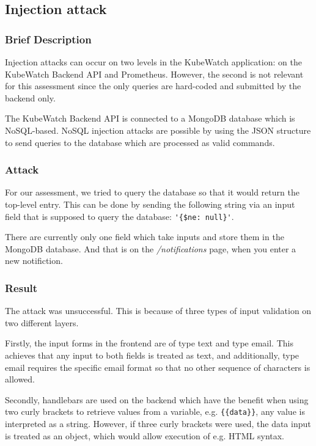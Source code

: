 \subsection{Injection attack}
\subsubsection{Brief Description}
Injection attacks can occur on two levels in the KubeWatch application: on the KubeWatch Backend API and Prometheus. However, the second is not relevant for this assessment since the only queries are hard-coded and submitted by the backend only.

The KubeWatch Backend API is connected to a MongoDB database which is NoSQL-based. NoSQL injection attacks are possible by using the JSON structure to send queries to the database which are processed as valid commands.

\subsubsection{Attack}
For our assessment, we tried to query the database so that it would return the top-level entry. This can be done by sending the following string via an input field that is supposed to query the database: \lstinline "'{$ne: null}'".

There are currently only one field which take inputs and store them in the MongoDB database. And that is on the \textit{/notifications} page, when you enter a new notifiction.

\subsubsection{Result}
The attack was unsuccessful. This is because of three types of input validation on two different layers.

Firstly, the input forms in the frontend are of type text and type email. This achieves that any input to both fields is treated as text, and additionally, type email requires the specific email format so that no other sequence of characters is allowed. 

Secondly, handlebars are used on the backend which have the benefit when using two curly brackets to retrieve values from a variable, e.g. \lstinline "{{data}}", any value is interpreted as a string. However, if three curly brackets were used, the data input is treated as an object, which would allow execution of e.g. HTML syntax.

